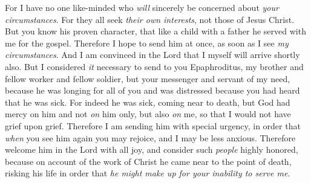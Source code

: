 \begin{biblechapter}
\verse For I have no one like-minded who \textit{will} sincerely be concerned about \textit{your circumstances}.
\verse For they all seek \textit{their own interests}, not those of Jesus Christ.
\verse But you know his proven character, that like a child with a father he served with me for the gospel.
\verse Therefore I hope to send him at once, as soon as I see \textit{my circumstances}.
\verse And I am convinced in the Lord that I myself will arrive shortly also.
 But I considered \textit{it} necessary to send to you Epaphroditus, my brother and fellow worker and fellow soldier, but your messenger and servant of my need,
\verse because he was longing for all of you and was distressed because you had heard that he was sick.
\verse For indeed he was sick, coming near to death, but God had mercy on him and not \textit{on} him only, but also \textit{on} me, so that I would not have grief upon grief.
\verse Therefore I am sending him with special urgency, in order that \textit{when} you see him again you may rejoice, and I may be less anxious.
\verse Therefore welcome him in the Lord with all joy, and consider such \textit{people} highly honored,
\verse because on account of the work of Christ he came near to the point of death, risking his life in order that \textit{he might make up for your inability to serve me}.
\end{biblechapter}

